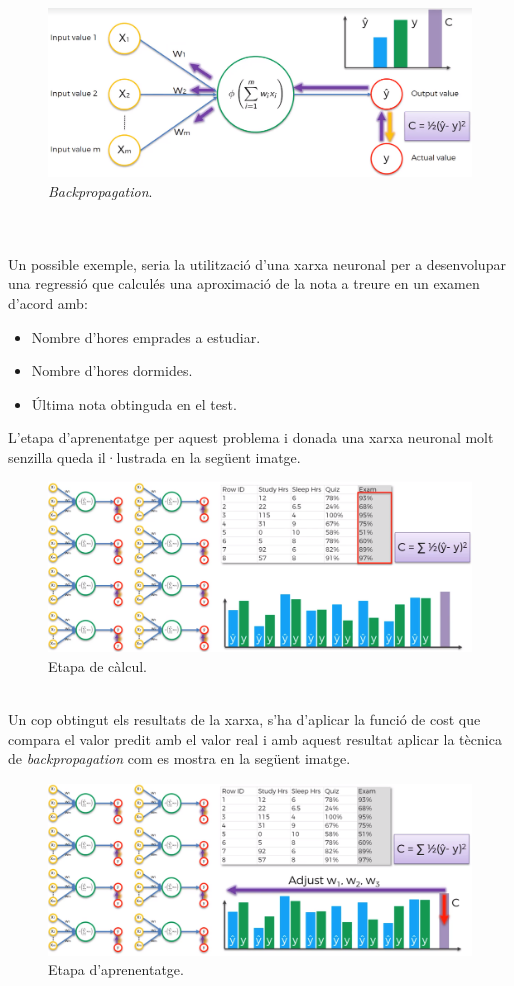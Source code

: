 \documentclass[12pt]{article}
\begin{document}
\begin{figure}[h!]
	\centering
	\includegraphics[scale=0.3]{imatges/aprendre/2bp.png}
	\caption{\textit{Backpropagation}.}
\end{figure}
\\\\Un possible exemple, seria la utilització d'una xarxa neuronal per a desenvolupar una regressió que calculés una aproximació de la nota a treure en un examen d'acord amb:
\begin{itemize}
	\item Nombre d'hores emprades a estudiar.
	\item Nombre d'hores dormides.
	\item Última nota obtinguda en el test.
\end{itemize}
L'etapa d'aprenentatge per aquest problema i donada una xarxa neuronal molt senzilla queda il·lustrada en la següent imatge.
\begin{figure}[h!]
	\centering
	\includegraphics[scale=0.3]{imatges/aprendre/3aprendre.png}
	\caption{Etapa de càlcul.}
	\label{fig:3aprendre}
\end{figure}
\\Un cop obtingut els resultats de la xarxa, s'ha d'aplicar la funció de cost que compara el valor predit amb el valor real i amb aquest resultat aplicar la tècnica de \textit{backpropagation} com es mostra en la següent imatge.
\begin{figure}[h!]
	\centering
	\includegraphics[scale=0.3]{imatges/aprendre/4bp.png}
	\caption{Etapa d'aprenentatge.}
	\label{fig:4bp}
\end{figure}
\end{document}
